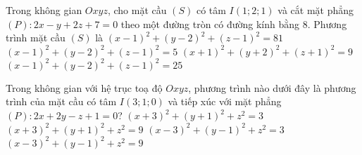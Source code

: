 \begin{ex}%
	Trong không gian $Oxyz$, cho mặt cầu $\left( S \right)$ có tâm $I\left( 1;2;1 \right)$ và cắt mặt phẳng $\left( P \right)\colon2x-y+2z+7=0$ theo một đường tròn có đường kính bằng $8$. Phương trình mặt cầu $\left( S \right)$ là
	\choice
	{$\left( x-1 \right)^2+\left( y-2 \right)^2+\left( z-1 \right)^2=81$}
	{${{\left( x-1 \right)}^2}+{{\left( y-2 \right)}^2}+{{\left( z-1 \right)}^2}=5$}
	{${{\left( x+1 \right)}^2}+{{\left( y+2 \right)}^2}+{{\left( z+1 \right)}^2}=9$}
	{\True ${{\left( x-1 \right)}^2}+{{\left( y-2 \right)}^2}+{{\left( z-1 \right)}^2}=25$}
\end{ex}

\begin{ex}%
	Trong không gian với hệ trục toạ độ $Oxyz$, phương trình nào dưới đây là phương trình của mặt cầu có tâm $I\left( 3;1;0 \right)$ và tiếp xúc với mặt phẳng $\left( P \right): 2x + 2y - z + 1=0$?
	\choice
	{${{\left( x+3 \right)}^2}+{{\left( y+1 \right)}^2}+z^2=3$}
	{${{\left( x+3 \right)}^2}+{{\left( y+1 \right)}^2}+z^2=9$}
	{${{\left( x-3 \right)}^2}+{{\left( y-1 \right)}^2}+z^2=3$}
	{\True ${{\left( x-3 \right)}^2}+{{\left( y-1 \right)}^2}+z^2=9$}
\end{ex}

